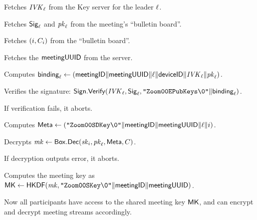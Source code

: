 \begingroup
\RaggedRight
\begin{enumerate*}
\item Fetches $\mathit{IVK}_{\ell}$ from the Key server for the leader $\ell$.
\item Fetches ${\sf Sig}_{\ell}$ and $\mathit{pk}_\ell$ from the meeting's ``bulletin board''.
\item Fetches $(i, C_i)$ from the ``bulletin board''.
\item Fetches the ${\sf meetingUUID}$ from the server.
\item Computes ${\sf binding}_\ell \leftarrow \left( {\sf meetingID} \| \allowbreak {\sf meetingUUID} \| \ell \allowbreak \| {\sf deviceID} \| \mathit{IVK}_\ell \| \allowbreak \mathit{pk}_\ell \right)$.
\item Verifies the signature: ${\sf Sign}.\mathsf{Verify}(\mathit{IVK}_{\ell}, {\sf Sig}_\ell, \texttt{"Zoom00EPubKeys\textbackslash0"} \|\allowbreak {\sf binding}_\ell)$.
\item If verification fails, it aborts.
\item Computes ${\sf Meta} \leftarrow \left(\texttt{"Zoom00SDKey\textbackslash0"} \| \allowbreak {\sf meetingID} \| \allowbreak {\sf meetingUUID} \| \allowbreak \ell \| i \right)$.
\item Decrypts $\mathit{mk} \leftarrow {\sf Box}.\mathsf{Dec}(\mathit{sk}_{i}, \mathit{pk}_{\ell}, {\sf Meta} \allowbreak, C)$.
   \label{participantJoinRekeyNonLeaderStart}
\item If decryption outputs {\sf error}, it aborts.
\item Computes the meeting key as ${\sf MK} \leftarrow {\sf HKDF}(\mathit{mk}, \texttt{"Zoom00SKey\textbackslash0"} \| \allowbreak {\sf meetingID} \|  \allowbreak {\sf meetingUUID})$.
   \label{participantJoinRekeyNonLeaderEnd}
\end{enumerate*}
\endgroup

Now all participants have access to the shared meeting key ${\sf MK}$, and can encrypt and decrypt meeting streams accordingly.

